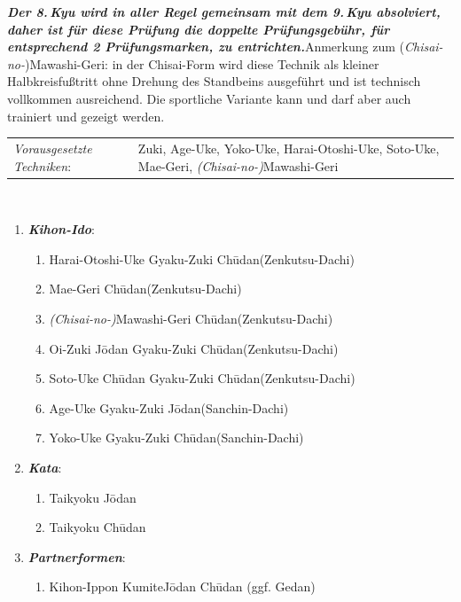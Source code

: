 \documentclass[a5paper,landscape,DIV=calc,11pt,notitlepage]{scrartcl}
\newcommand{\bull}{\,\textbullet\,}
\begin{document}
\begin{tcolorbox}[colback=white,colframe=YBELT,coltitle=black,title=8. Kyu: Gelb]
	\renewcommand{\labelenumi}{\alph{enumi}.)}
	\renewcommand{\labelenumii}{\arabic*.}
	{\scriptsize\textbf{\textit{Der 8.\,Kyu wird in aller Regel gemeinsam mit dem 9.\,Kyu absolviert, daher ist für diese Prüfung die doppelte Prüfungsgebühr, für entsprechend 2 Prüfungsmarken, zu entrichten.}}\newline Anmerkung zum (\textit{Chisai-no-})Mawashi-Geri: in der Chisai-Form wird diese Technik als kleiner Halbkreisfußtritt ohne Drehung des Standbeins ausgeführt und ist technisch vollkommen ausreichend. Die sportliche Variante kann und darf aber auch trainiert und gezeigt werden.\newline
	\begin{tabularx}{\textwidth}{lX}
		\textit{Vorausgesetzte Techniken}:& Zuki, Age-Uke, Yoko-Uke, Harai-Otoshi-Uke, Soto-Uke, Mae-Geri, \textit{(Chisai-no-)}Mawashi-Geri
	\end{tabularx}\\}\vspace{12pt}
	\begin{enumerate}[nosep]
		\item \textit{\textbf{Kihon-Ido}}:
		\begin{enumerate}[nosep]
			\item Harai-Otoshi-Uke\bull Gyaku-Zuki Ch\={u}dan\tabto{280pt}(Zenkutsu-Dachi)
			\item Mae-Geri Ch\={u}dan\tabto{280pt}(Zenkutsu-Dachi)
			\item \textit{(Chisai-no-)}Mawashi-Geri Ch\={u}dan\tabto{280pt}(Zenkutsu-Dachi)
			\item Oi-Zuki J\={o}dan\bull Gyaku-Zuki Ch\={u}dan\tabto{280pt}(Zenkutsu-Dachi)
			\item Soto-Uke Ch\={u}dan\bull Gyaku-Zuki Ch\={u}dan\tabto{280pt}(Zenkutsu-Dachi)
			\item Age-Uke\bull Gyaku-Zuki J\={o}dan\tabto{280pt}(Sanchin-Dachi)
			\item Yoko-Uke\bull Gyaku-Zuki Ch\={u}dan\tabto{280pt}(Sanchin-Dachi)
		\end{enumerate}\vspace{24pt}
		\item \textit{\textbf{Kata}}:
		\begin{enumerate}[nosep]
			\item Taikyoku J\={o}dan
			\item Taikyoku Ch\={u}dan
		\end{enumerate}\vspace{24pt}
		\item \textit{\textbf{Partnerformen}}:
		\begin{enumerate}[nosep]
			\item Kihon-Ippon Kumite\tabto{280pt}J\={o}dan\bull Ch\={u}dan (ggf. Gedan)
		\end{enumerate}
	\end{enumerate}
\end{tcolorbox}
\end{document}
